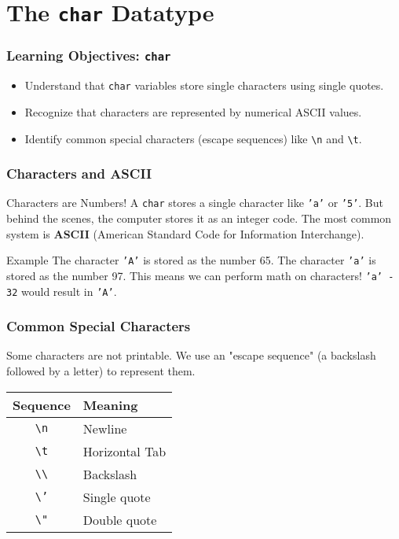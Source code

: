 \documentclass{beamer}
\begin{document}
\section{The \texttt{char} Datatype}

\begin{frame}
\frametitle{Learning Objectives: \texttt{char}}
\begin{itemize}
    \item Understand that \texttt{char} variables store single characters using single quotes.\pause
    \item Recognize that characters are represented by numerical ASCII values.\pause
    \item Identify common special characters (escape sequences) like \texttt{\textbackslash n} and \texttt{\textbackslash t}.
\end{itemize}
\end{frame}

\begin{frame}
\frametitle{Characters and ASCII}
\begin{alertblock}{Characters are Numbers!}
A \texttt{char} stores a single character like \texttt{'a'} or \texttt{'5'}. But behind the scenes, the computer stores it as an integer code. The most common system is \textbf{ASCII} (American Standard Code for Information Interchange).
\end{alertblock}\pause
\begin{exampleblock}{Example}
The character \texttt{'A'} is stored as the number 65.
\newline
The character \texttt{'a'} is stored as the number 97.\pause
\newline
This means we can perform math on characters! \texttt{'a' - 32} would result in \texttt{'A'}.
\end{exampleblock}
\end{frame}

\begin{frame}
\frametitle{Common Special Characters}
Some characters are not printable. We use an "escape sequence" (a backslash followed by a letter) to represent them.\pause
\begin{center}
\begin{tabular}{|c|l|}
\hline
\textbf{Sequence} & \textbf{Meaning} \\ \hline
\texttt{\textbackslash n} & Newline \\
\texttt{\textbackslash t} & Horizontal Tab \\
\texttt{\textbackslash\textbackslash} & Backslash \\
\texttt{\textbackslash'} & Single quote \\
\texttt{\textbackslash"} & Double quote \\ \hline
\end{tabular}
\end{center}
\end{frame}
\end{document}
